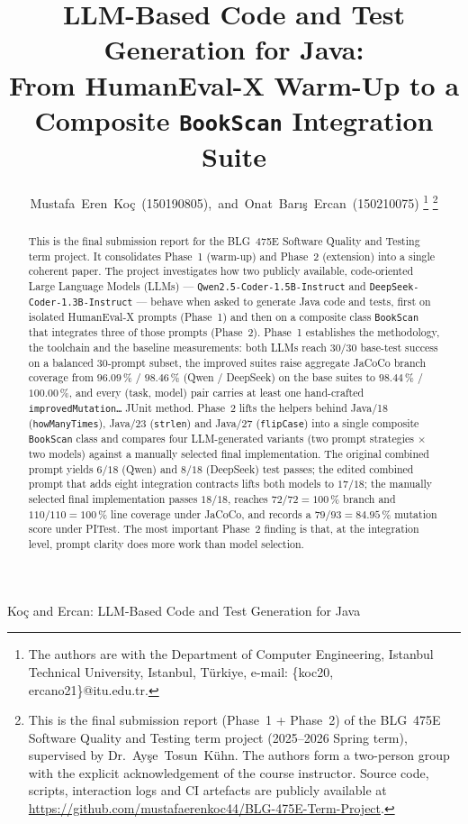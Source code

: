 \documentclass[journal]{IEEEtran}
\begin{document}
\title{LLM-Based Code and Test Generation for Java:\\
From HumanEval-X Warm-Up to a Composite \texttt{BookScan} Integration Suite}

\author{Mustafa~Eren~Ko\c{c}~(150190805),~and~Onat~Bar{\i}\c{s}~Ercan~(150210075)%
\thanks{The authors are with the Department of Computer Engineering,
Istanbul Technical University, Istanbul, T\"urkiye, e-mail:
\{koc20, ercano21\}@itu.edu.tr.}%
\thanks{This is the final submission report (Phase~1 + Phase~2) of the
BLG~475E Software Quality and Testing term project (2025--2026 Spring
term), supervised by Dr.~Ay\c{s}e~Tosun~K\"uhn. The authors form a
two-person group with the explicit acknowledgement of the course
instructor. Source code, scripts, interaction logs and CI artefacts are
publicly available at
\url{https://github.com/mustafaerenkoc44/BLG-475E-Term-Project}.}}

%
{Ko\c{c} and Ercan: LLM-Based Code and Test Generation for Java}

\maketitle

\begin{abstract}
This is the final submission report for the BLG~475E Software Quality and
Testing term project. It consolidates Phase~1 (warm-up) and Phase~2
(extension) into a single coherent paper. The project investigates how
two publicly available, code-oriented Large Language Models (LLMs)
--- \texttt{Qwen2.5-Coder-1.5B-Instruct} and
\texttt{DeepSeek-Coder-1.3B-Instruct} --- behave when asked to generate
Java code and tests, first on isolated HumanEval-X prompts (Phase~1) and
then on a composite class \texttt{BookScan} that integrates three of those
prompts (Phase~2). Phase~1 establishes the methodology, the toolchain and
the baseline measurements: both LLMs reach $30/30$ base-test success on a
balanced 30-prompt subset, the improved suites raise aggregate JaCoCo
branch coverage from $96.09\,\%$ / $98.46\,\%$ (Qwen / DeepSeek) on the
base suites to $98.44\,\%$ / $100.00\,\%$, and every (task, model) pair
carries at least one hand-crafted \texttt{improvedMutation\ldots} JUnit
method. Phase~2 lifts the helpers behind Java/18 (\texttt{howManyTimes}),
Java/23 (\texttt{strlen}) and Java/27 (\texttt{flipCase}) into a single
composite \texttt{BookScan} class and compares four LLM-generated
variants (two prompt strategies $\times$ two models) against a manually
selected final implementation. The original combined prompt yields
$6/18$ (Qwen) and $8/18$ (DeepSeek) test passes; the edited combined
prompt that adds eight integration contracts lifts both models to
$17/18$; the manually selected final implementation passes $18/18$,
reaches $72/72=100\,\%$ branch and $110/110=100\,\%$ line coverage under
JaCoCo, and records a $79/93=84.95\,\%$ mutation score under PITest. The
most important Phase~2 finding is that, at the integration level, prompt
clarity does more work than model selection.
\end{abstract}
\end{document}
